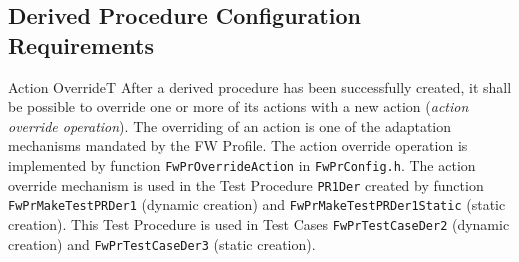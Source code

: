 \documentclass[a4paper,10pt]{article}
\newenvironment{fw_req}[6]
{\addtocounter{subsubsection}{1}
	\hspace{0.2cm}\textbf{FW-\arabic{section}.\arabic{subsection}.\arabic{subsubsection}/#2
	\hspace{0.8cm} #1}
	\vspace{-10pt}
\begin{longtable}{p{2.7cm}P{8.5cm}}
\hline
\textsc{Requirement} & #3 \\
\textsc{Justification} & #4 \\
\textsc{Implementation} & #5  \\ 
\textsc{Verification} & #6  \\
\hline
}
{\end{longtable}}
\begin{document}
\subsection{Derived Procedure Configuration Requirements}\label{req:configInterfaceDerivedPR}

\begin{fw_req}{Action Override}{T}
{After a derived procedure has been successfully created, it shall be possible to override one or more of its actions 
with a new action (\emph{action override operation}).}
{The overriding of an action is one of the adaptation mechanisms mandated by the FW Profile.}
{The action override operation is implemented by function \texttt{FwPrOverrideAction} in \texttt{FwPrConfig.h}.} 
{The action override mechanism is used in the Test Procedure \texttt{PR1Der} created by function 
\texttt{FwPrMakeTestPRDer1} (dynamic creation) and \texttt{FwPrMakeTestPRDer1Static} (static creation). This Test Procedure is used in 
Test Cases \texttt{FwPrTestCaseDer2} (dynamic creation) and \texttt{FwPrTestCaseDer3} (static creation).}
\end{fw_req}


\end{document}
